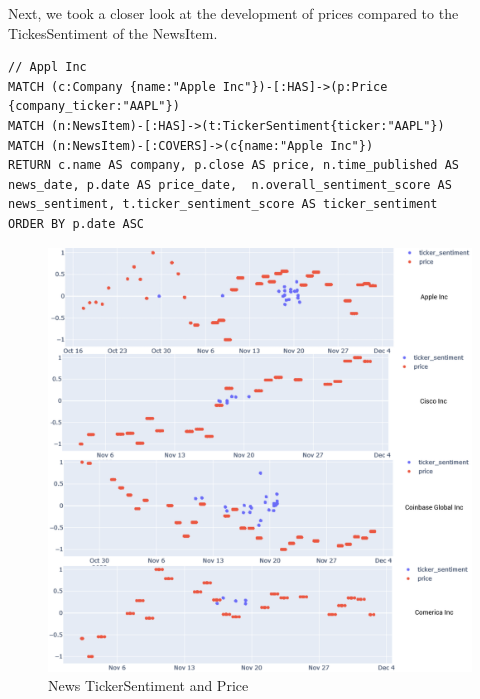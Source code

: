 Next, we took a closer look at the development of prices compared to the TickesSentiment of the NewsItem.
\begin{lstlisting}[caption={Relationship of NewsItem TikerSantiment and Price of Apple Stock }, label={lst:newsItems_tikerSantiment_and_price_apple},captionpos=b]
// Appl Inc
MATCH (c:Company {name:"Apple Inc"})-[:HAS]->(p:Price {company_ticker:"AAPL"})
MATCH (n:NewsItem)-[:HAS]->(t:TickerSentiment{ticker:"AAPL"})
MATCH (n:NewsItem)-[:COVERS]->(c{name:"Apple Inc"})
RETURN c.name AS company, p.close AS price, n.time_published AS news_date, p.date AS price_date,  n.overall_sentiment_score AS news_sentiment, t.ticker_sentiment_score AS ticker_sentiment
ORDER BY p.date ASC
\end{lstlisting}

\begin{figure}[h]
 \centering
 \includegraphics[width=1.0\textwidth]{images/price_news_ticker_charts.png}
 \caption{News TickerSentiment and Price}
 \label{fig:price_news_sentiment}
\end{figure}

